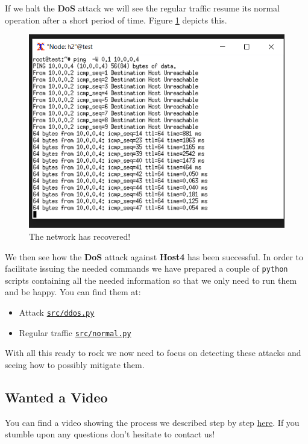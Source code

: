 \documentclass[12pt]{report}
\begin{document}
			If we halt the \textbf{DoS} attack we will see the regular traffic resume its normal operation after a short period of time. Figure \ref{f:net_ok} depicts this.

			\begin{figure}
				\centering
				\includegraphics[scale = 1]{net_ok.png}
				\caption{The network has recovered!}
				\label{f:net_ok}
			\end{figure}

			We then see how the \textbf{DoS} attack against \textbf{Host4} has been successful. In order to facilitate issuing the needed commands we have prepared a couple of \texttt{python} scripts containing all the needed information so that we only need to run them and be happy. You can find them at:

			\begin{itemize}
				\item Attack \href{https://github.com/GAR-Project/project/blob/master/src/ddos.py}{\texttt{src/ddos.py}}
				\item Regular traffic \href{https://github.com/GAR-Project/project/blob/master/src/normal.py}{\texttt{src/normal.py}}
			\end{itemize}

			With all this ready to rock we now need to focus on detecting these attacks and seeing how to possibly mitigate them.

		\subsection{Wanted a Video}
			You can find a video showing the process we described step by step \href{https://www.youtube.com/watch?v=ofZPmV6_y_M}{here}. If you stumble upon any questions don't hesitate to contact us!
\end{document}
